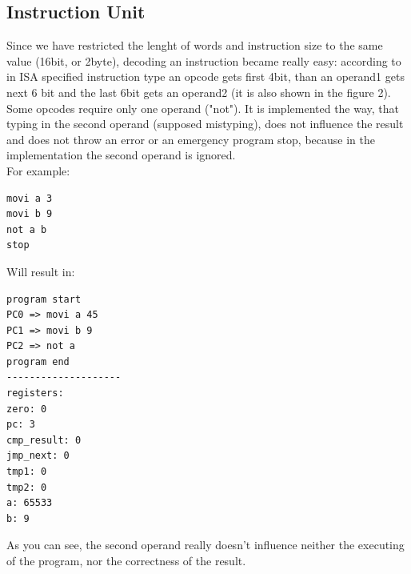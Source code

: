 \documentclass[11pt,a4paper]{article}
\begin{document}
\subsection{Instruction Unit}
Since we have restricted the lenght of words and instruction size to the same value (16bit, or 2byte), decoding an instruction became really easy:
according to in ISA specified instruction type an opcode gets first 4bit, than an operand1 gets next 6 bit and the last 6bit gets an operand2 (it is also shown in the figure 2). Some opcodes require only one operand ("not"). It is implemented the way, that typing in the second operand (supposed mistyping), does not influence the result and does not throw an error or an emergency program stop, because in the implementation the second operand is ignored.\\
For example:
\newpage
\begin{verbatim}
movi a 3
movi b 9
not a b
stop
\end{verbatim}
Will result in:
\begin{verbatim}
program start
PC0 => movi a 45
PC1 => movi b 9
PC2 => not a
program end
--------------------
registers:
zero: 0
pc: 3
cmp_result: 0
jmp_next: 0
tmp1: 0
tmp2: 0
a: 65533
b: 9
\end{verbatim}
As you can see, the second operand really doesn't influence neither the executing of the program, nor the correctness of the result.\\

\newpage
\end{document}
